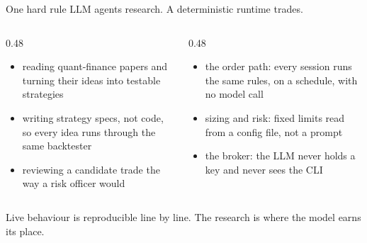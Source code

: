 \documentclass[aspectratio=169,10pt]{beamer}
\newcommand{\muted}[1]{{\color{muted}#1}}
\begin{document}
\begin{frame}{One hard rule}
  \vspace{0.3em}
  {\Large LLM agents research. \quad A deterministic runtime trades.}
  \vspace{0.9em}
  \begin{columns}[T]
    \begin{column}{0.48\textwidth}
      \begin{itemize}
        \item reading quant-finance papers and turning their ideas into testable strategies
        \item writing strategy specs, not code, so every idea runs through the same backtester
        \item reviewing a candidate trade the way a risk officer would
      \end{itemize}
    \end{column}
    \begin{column}{0.48\textwidth}
      \begin{itemize}
        \item the order path: every session runs the same rules, on a schedule, with no model call
        \item sizing and risk: fixed limits read from a config file, not a prompt
        \item the broker: the LLM never holds a key and never sees the CLI
      \end{itemize}
    \end{column}
  \end{columns}
  \vspace{0.9em}
  \muted{Live behaviour is reproducible line by line. The research is where the model earns its place.}
\end{frame}
\end{document}

